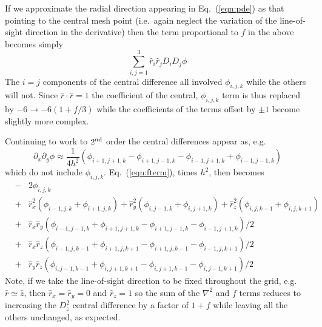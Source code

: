 \documentclass[a4paper,11pt]{article}
\begin{document}
If we approximate the radial direction appearing in Eq.~(\ref{eqn:pde})
as that pointing to the central mesh point (i.e.~again neglect the variation
of the line-of-sight direction in the derivative) then the term proportional
to $f$ in the above becomes simply
\begin{equation}
  \sum_{i,j=1}^3 \hat{r}_i\hat{r}_j D_iD_j \phi
\end{equation}
The $i=j$ components of the central difference all involved $\phi_{i,j,k}$
while the others will not.  Since $\hat{r}\cdot\hat{r}=1$ the coefficient
of the central, $\phi_{i,j,k}$ term is thus replaced by $-6\to -6(1+f/3)$
while the coefficients of the terms offset by $\pm 1$ become slightly more
complex.

Continuing to work to $2^{\rm nd}$ order the central differences appear as, e.g.
\begin{equation}
  \partial_x\partial_y\phi \approx \frac{1}{4h^2}\left(
  \phi_{i+1,j+1,k}-\phi_{i+1,j-1,k}-\phi_{i-1,j+1,k}+\phi_{i-1,j-1,k}\right)
\end{equation}
which do not include $\phi_{i,j,k}$.
Eq.~(\ref{eqn:fterm}), times $h^2$, then becomes
\begin{eqnarray}
  &-& 2\phi_{i,j,k} \nonumber \\
  &+&\hat{r}_x^2 \left( \phi_{i-1,j,k}+\phi_{i+1,j,k} \right)
   + \hat{r}_y^2 \left( \phi_{i,j-1,k}+\phi_{i,j+1,k} \right)
   + \hat{r}_z^2 \left( \phi_{i,j,k-1}+\phi_{i,j,k+1} \right)   \nonumber \\
  &+&\hat{r}_x\hat{r}_y\left( \phi_{i-1,j-1,k}+\phi_{i+1,j+1,k}
                             -\phi_{i+1,j-1,k}-\phi_{i-1,j+1,k} \right)/2
      \nonumber \\
  &+&\hat{r}_x\hat{r}_z\left( \phi_{i-1,j,k-1}+\phi_{i+1,j,k+1}
                             -\phi_{i+1,j,k-1}-\phi_{i-1,j,k+1} \right)/2
      \nonumber \\
  &+&\hat{r}_y\hat{r}_z\left( \phi_{i,j-1,k-1}+\phi_{i,j+1,k+1}
                             -\phi_{i,j+1,k-1}-\phi_{i,j-1,k+1} \right)/2
\end{eqnarray}
Note, if we take the line-of-sight direction to be fixed throughout the grid,
e.g.~$\hat{r}\simeq\hat{z}$, then $\hat{r}_x=\hat{r}_y=0$ and $\hat{r}_z=1$
so the sum of the $\nabla^2$ and $f$ terms reduces to increasing the $D_z^2$
central difference by a factor of $1+f$ while leaving all the others unchanged,
as expected.
\end{document}
